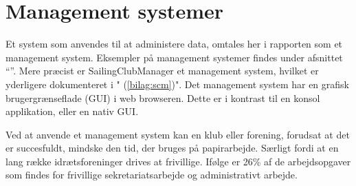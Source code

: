 \section{Management systemer}\label{sec:management-systemer}

\cbstart

Et system som anvendes til at administere data, omtales her i rapporten som et management system. 
Eksempler på management systemer findes under afsnittet ``''. 
Mere præcist er SailingClubManager et management system, hvilket er yderligere dokumenteret i "  (\ref{bilag:scm})". 
Det management system har en grafisk brugergrænseflade (GUI) i web browseren. 
Dette er i kontrast til en konsol applikation, eller en nativ GUI. 
\newline 

Ved at anvende et management system kan en klub eller forening, forudsat at det er succesfuldt, mindske den tid, der bruges på papirarbejde. Særligt fordi at en lang række idrætsforeninger drives at frivillige. 
Ifølge \cite{Frivilligrapporten} er 26\% af de arbejdsopgaver som findes for frivillige sekretariatsarbejde og administrativt arbejde. 




\cbend
